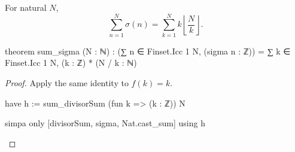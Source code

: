 \begin{theorem}
  \label{ent:thm:sum-sigma}
  For natural $N$, \[ \sum_{n=1}^N\sigma(n)=\sum_{k=1}^N k\left\lfloor\frac Nk\right\rfloor. \]

  \begin{lean}
    theorem sum_sigma (N : ℕ) :
        (∑ n ∈ Finset.Icc 1 N, (sigma n : ℤ)) =
          ∑ k ∈ Finset.Icc 1 N, (k : ℤ) * (N / k : ℕ)
  \end{lean}
\end{theorem}

\begin{proof}
  Apply the same identity to $f(k)=k$.

  \begin{lean}
    have h := sum_divisorSum (fun k => (k : ℤ)) N

    simpa only [divisorSum, sigma, Nat.cast_sum] using h
  \end{lean}
\end{proof}
